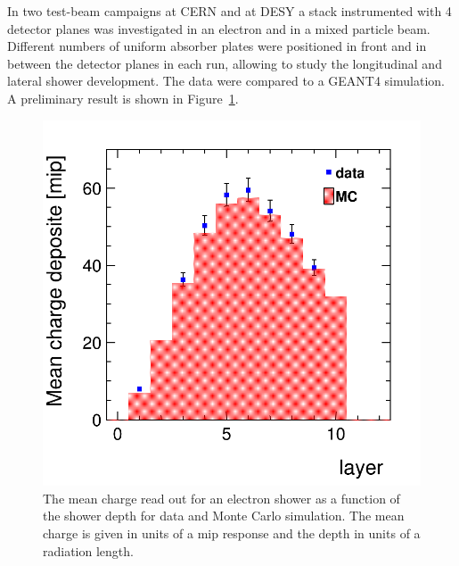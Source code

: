 In two test-beam campaigns at CERN and at DESY a stack instrumented with 4 detector planes was investigated in
an electron and in a mixed particle beam.
Different numbers of uniform absorber plates were positioned in front and in between the detector planes in each
run, allowing to study the longitudinal and lateral shower development.
The data were compared to a GEANT4 simulation. A preliminary result is shown in Figure~\ref{fig:shower_development}.
\begin{figure}[hbp]
\centering
\includegraphics[width=0.6\columnwidth]{Calorimeter/FCAL/figs/long_shower}
\caption{The mean charge read out for an electron shower as a function of the shower depth for data and Monte Carlo
simulation.
The mean charge is given in units of a mip response and the depth in units of a radiation length.  }
\label{fig:shower_development}
\end{figure}


